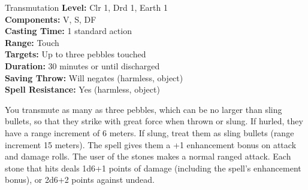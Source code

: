 {Transmutation}
{
	\textbf{Level:}
	Clr 1, Drd 1, Earth 1\\
	\textbf{Components:}
	V, S, DF\\
	\textbf{Casting Time:}
	1 standard action\\
	\textbf{Range:}
	Touch\\
	\textbf{Targets:}
	Up to three pebbles touched\\
	\textbf{Duration:}
	30 minutes or until discharged\\
	\textbf{Saving Throw:}
	Will negates (harmless, object)\\
	\textbf{Spell Resistance:}
	Yes (harmless, object)\\
}
{
	You transmute as many as three pebbles, which can be no larger than sling bullets, so that they strike with great force when thrown or slung. If hurled, they have a range increment of 6 meters. If slung, treat them as sling bullets (range increment 15 meters). The spell gives them a +1 enhancement bonus on attack and damage rolls. The user of the stones makes a normal ranged attack. Each stone that hits deals 1d6+1 points of damage (including the spell's enhancement bonus), or 2d6+2 points against undead.

}
